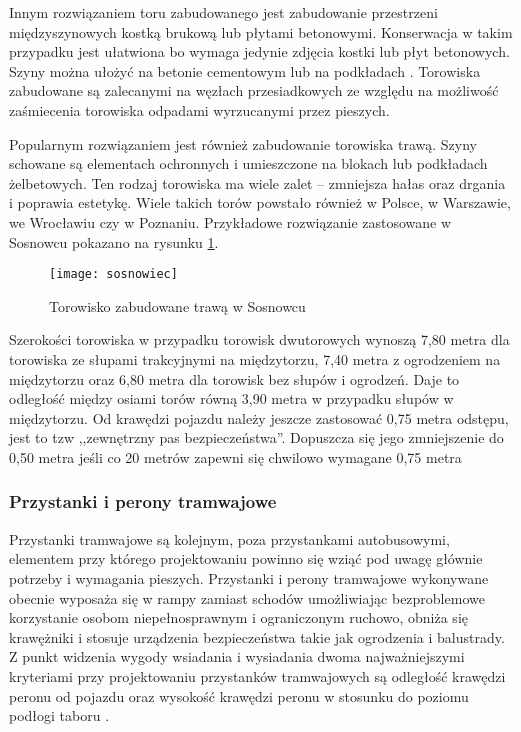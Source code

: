\documentclass[twoside,12pt]{article}
\begin{document}
	Innym rozwiązaniem toru zabudowanego jest zabudowanie przestrzeni międzyszynowych kostką brukową lub płytami betonowymi. Konserwacja w takim przypadku jest ułatwiona bo wymaga jedynie zdjęcia kostki lub płyt betonowych. Szyny można ułożyć na betonie cementowym lub na podkładach \cite{czauderna}. Torowiska zabudowane są zalecanymi na węzłach przesiadkowych ze względu na możliwość zaśmiecenia torowiska odpadami wyrzucanymi przez pieszych.
	
	Popularnym rozwiązaniem jest również zabudowanie torowiska trawą. Szyny schowane są  elementach ochronnych i umieszczone na blokach lub podkładach żelbetowych. Ten rodzaj torowiska ma wiele zalet -- zmniejsza hałas oraz drgania i poprawia estetykę. Wiele takich torów powstało również w Polsce, w Warszawie, we Wrocławiu czy w Poznaniu. Przykładowe rozwiązanie zastosowane w Sosnowcu pokazano na rysunku \ref{sosnowiec}.
	
	\begin{figure}[H]
		\centering
		\texttt{[image: sosnowiec]}\\
		\caption{Torowisko zabudowane trawą w Sosnowcu}
		\label{sosnowiec}
	\end{figure}	
	
	Szerokości torowiska w przypadku torowisk dwutorowych wynoszą 7,80 metra dla torowiska ze słupami trakcyjnymi na międzytorzu, 7,40 metra z ogrodzeniem na międzytorzu oraz 6,80 metra dla torowisk bez słupów i ogrodzeń. Daje to odległość między osiami torów równą 3,90 metra w przypadku słupów w międzytorzu. Od krawędzi pojazdu należy jeszcze zastosować 0,75 metra odstępu, jest to tzw ,,zewnętrzny pas bezpieczeństwa''. Dopuszcza się jego zmniejszenie do 0,50 metra jeśli co 20 metrów zapewni się chwilowo wymagane 0,75 metra \cite{oleksiewicz}
	
	\subsubsection{Przystanki i perony tramwajowe}
	Przystanki tramwajowe są kolejnym, poza przystankami autobusowymi, elementem przy którego projektowaniu powinno się wziąć pod uwagę głównie potrzeby i wymagania pieszych. Przystanki i perony tramwajowe wykonywane obecnie wyposaża się w rampy zamiast schodów umożliwiając bezproblemowe korzystanie osobom niepełnosprawnym i ograniczonym ruchowo, obniża się krawężniki i stosuje urządzenia bezpieczeństwa takie jak ogrodzenia i balustrady. Z punkt widzenia wygody wsiadania i wysiadania dwoma najważniejszymi kryteriami przy projektowaniu przystanków tramwajowych są odległość krawędzi peronu od pojazdu oraz wysokość krawędzi peronu w stosunku do poziomu podłogi taboru \cite{makuch2}. 
	
\end{document}
